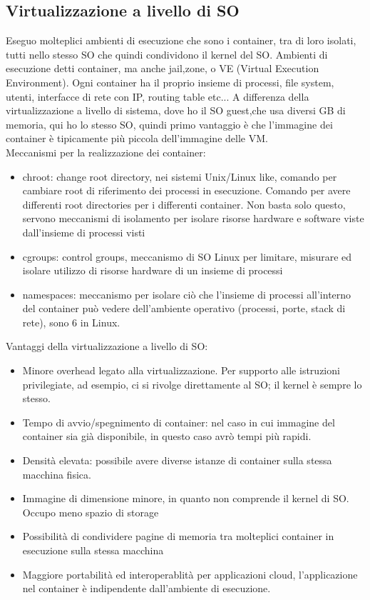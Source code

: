 \documentclass[16px]{article}
\begin{document}
\subsection{Virtualizzazione a livello di SO}
Eseguo molteplici ambienti di esecuzione che sono i container, tra di loro isolati, tutti nello stesso SO che quindi condividono il kernel del SO. Ambienti di esecuzione detti container, ma anche jail,zone, o VE (Virtual Execution Environment). Ogni container ha il proprio insieme di processi, file system, utenti, interfacce di rete con IP, routing table etc... A differenza della virtualizzazione a livello di sistema, dove ho il SO guest,che usa diversi GB di memoria, qui ho lo stesso SO, quindi primo vantaggio è che l'immagine dei container è tipicamente più piccola dell'immagine delle VM.\\ Meccanismi per la realizzazione dei container:
\begin{itemize}
\item chroot: change root directory, nei sistemi Unix/Linux like, comando per cambiare root di riferimento dei processi in esecuzione. Comando per avere differenti root directories per i differenti container. Non basta solo questo, servono meccanismi di isolamento per isolare risorse hardware e software viste dall'insieme di processi visti 
\item cgroups: control groups, meccanismo di SO Linux per limitare, misurare ed isolare utilizzo di risorse hardware di un insieme di processi
\item namespaces: meccanismo per isolare ciò che l'insieme di processi all'interno del container può vedere dell'ambiente operativo (processi, porte, stack di rete), sono 6 in Linux.
\end{itemize}
Vantaggi della virtualizzazione a livello di SO:
\begin{itemize}
\item Minore overhead legato alla virtualizzazione. Per supporto alle istruzioni privilegiate, ad esempio, ci si rivolge direttamente al SO; il kernel è sempre lo stesso.
\item Tempo di avvio/spegnimento di container: nel caso in cui immagine del container sia già disponibile, in questo caso avrò tempi più rapidi.
\item Densità elevata: possibile avere diverse istanze di container sulla stessa macchina fisica.
\item Immagine di dimensione minore, in quanto non comprende il kernel di SO. Occupo meno spazio di storage
\item Possibilità di condividere pagine di memoria tra molteplici container in esecuzione sulla stessa  macchina
\item Maggiore portabilità ed interoperablità per applicazioni cloud, l'applicazione nel container è indipendente dall'ambiente di esecuzione.
\end{itemize}
\end{document}
